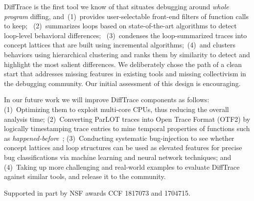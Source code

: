 DiffTrace is the first tool we know of that situates debugging around {\em whole program}
diffing, and~(1)~provides user-selectable front-end filters of function calls to keep;
~(2)~summarizes loops based on state-of-the-art algorithms to detect loop-level
behavioral differences;
~(3)~condenses the loop-summarized
traces into concept lattices that are built using incremental
algorithms;~(4)~and clusters behaviors using hierarchical clustering and ranks them by similarity to detect and highlight the most salient differences.
We deliberately chose the path of a clean start that addresses missing features
in existing tools and missing collectivism in the debugging community.
%
Our initial assessment of this design is encouraging.
%

In our future work we will improve DiffTrace components as follows:
%
%
(1)~Optimizing them to exploit multi-core CPUs, thus reducing the overall analysis time;
%
(2)~Converting ParLOT traces into Open Trace Format (OTF2) by logically timestamping trace entries to mine temporal properties of functions such as \textit{happened-before}~\cite{lamport};
%
(3)~Conducting systematic bug-injection to see whether concept lattices and loop structures can be used as elevated features for precise bug classifications via machine learning and neural network techniques; and
%
(4)~Taking up more challenging and real-world examples to evaluate DiffTrace against similar tools, and release it to the community.

 Supported in part by
NSF awards CCF 1817073 and 1704715.
